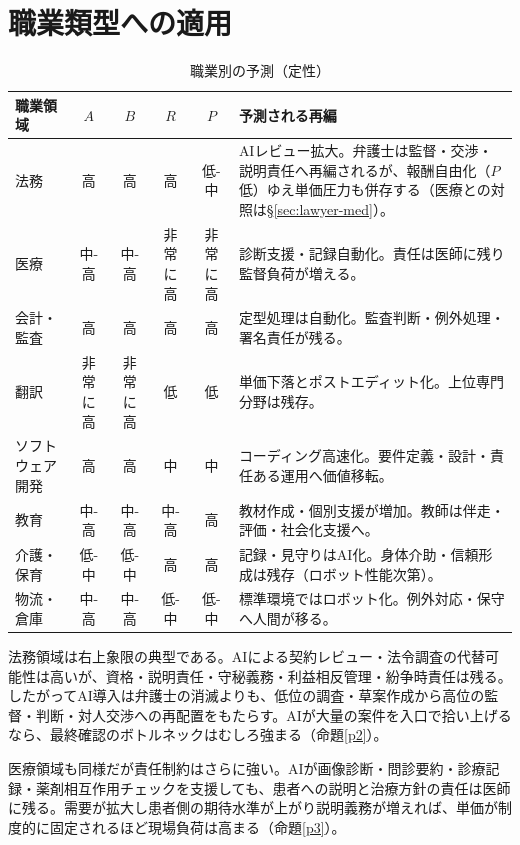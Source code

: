 \documentclass[11pt]{article}
\theoremstyle{plain}
\theoremstyle{definition}
\theoremstyle{remark}
\begin{document}
\section{職業類型への適用}

\begin{table}[h]\centering\small
\caption{職業別の予測（定性）}\label{tab:occ}
\begin{tabularx}{\textwidth}{@{}lccccX@{}}
\toprule
職業領域 & $A$ & $B$ & $R$ & $P$ & 予測される再編 \\ \midrule
法務 & 高 & 高 & 高 & 低-中 & AIレビュー拡大。弁護士は監督・交渉・説明責任へ再編されるが、報酬自由化（$P$ 低）ゆえ単価圧力も併存する（医療との対照は\S\ref{sec:lawyer-med}）。 \\
医療 & 中-高 & 中-高 & 非常に高 & 非常に高 & 診断支援・記録自動化。責任は医師に残り監督負荷が増える。 \\
会計・監査 & 高 & 高 & 高 & 高 & 定型処理は自動化。監査判断・例外処理・署名責任が残る。 \\
翻訳 & 非常に高 & 非常に高 & 低 & 低 & 単価下落とポストエディット化。上位専門分野は残存。 \\
ソフトウェア開発 & 高 & 高 & 中 & 中 & コーディング高速化。要件定義・設計・責任ある運用へ価値移転。 \\
教育 & 中-高 & 中-高 & 中-高 & 高 & 教材作成・個別支援が増加。教師は伴走・評価・社会化支援へ。 \\
介護・保育 & 低-中 & 低-中 & 高 & 高 & 記録・見守りはAI化。身体介助・信頼形成は残存（ロボット性能次第）。 \\
物流・倉庫 & 中-高 & 中-高 & 低-中 & 低-中 & 標準環境ではロボット化。例外対応・保守へ人間が移る。 \\
\bottomrule
\end{tabularx}
\end{table}

法務領域は右上象限の典型である。AIによる契約レビュー・法令調査の代替可能性は高いが、資格・説明責任・守秘義務・利益相反管理・紛争時責任は残る。したがってAI導入は弁護士の消滅よりも、低位の調査・草案作成から高位の監督・判断・対人交渉への再配置をもたらす。AIが大量の案件を入口で拾い上げるなら、最終確認のボトルネックはむしろ強まる（命題\ref{p2}）。

医療領域も同様だが責任制約はさらに強い。AIが画像診断・問診要約・診療記録・薬剤相互作用チェックを支援しても、患者への説明と治療方針の責任は医師に残る。需要が拡大し患者側の期待水準が上がり説明義務が増えれば、単価が制度的に固定されるほど現場負荷は高まる（命題\ref{p3}）。
\end{document}
